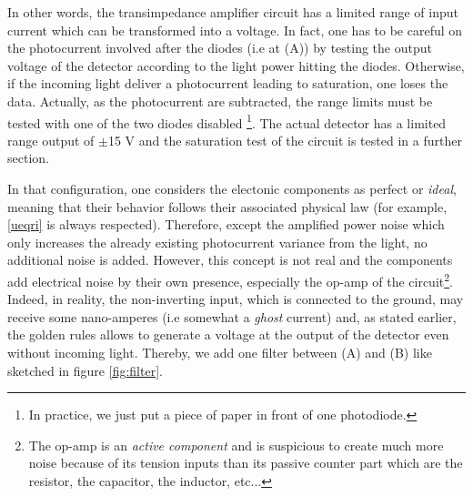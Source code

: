 \documentclass[11pt]{report}
\begin{document}
In other words, the transimpedance amplifier circuit has a limited range of input current which can be transformed into a voltage. In fact, one has to be careful on the photocurrent involved after the diodes (i.e at (A)) by testing the output voltage of the detector according to the light power hitting the diodes. Otherwise, if the incoming light deliver a photocurrent leading to saturation, one loses the data. Actually, as the photocurrent are subtracted, the range limits must be tested with one of the two diodes disabled \footnote{In practice, we just put a piece of paper in front of one photodiode.}. The actual detector has a limited range output of $\pm$15 V and the saturation test of the circuit is tested in a further section.

In that configuration, one considers the electonic components as perfect or \textit{ideal}, meaning that their behavior follows their associated physical law (for example, \eqref{ueqri} is always respected). Therefore, except the amplified power noise which only increases the already existing photocurrent variance from the light, no additional noise is added. However, this concept is not real and the components add electrical noise by their own presence, especially the op-amp of the circuit\footnote{The op-amp is an \textit{active component} and is suspicious to create much more noise because of its tension inputs than its passive counter part which are the resistor, the capacitor, the inductor, etc...}. Indeed, in reality, the non-inverting input, which is connected to the ground, may receive some nano-amperes (i.e somewhat a \textit{ghost} current) and, as stated earlier, the golden rules allows to generate a voltage at the output of the detector even without incoming light. Thereby, we add one filter between (A) and (B) like sketched in figure \ref{fig:filter}.
\end{document}
